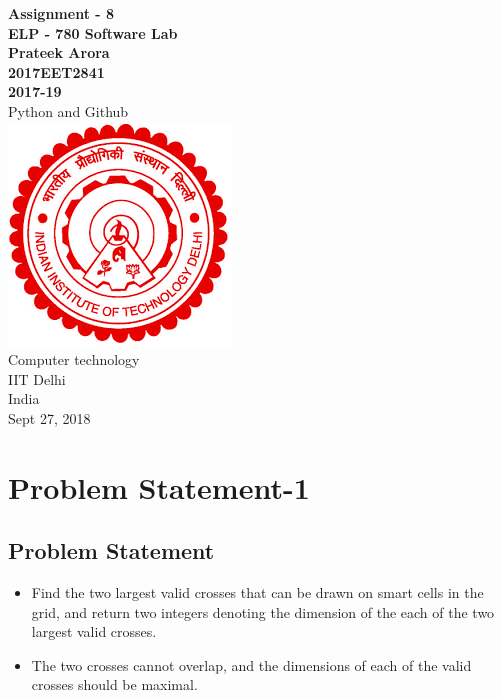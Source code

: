 \documentclass{article}
\begin{document}
\clearpage
\thispagestyle{empty}

\begin{center}
\Large\textbf{Assignment - 8}
\vspace*{1\baselineskip}
\\
\LARGE\textbf{ELP - 780 Software Lab}
\vspace*{1\baselineskip}
\\
\Large\textbf{Prateek Arora}
\\
\Large\textbf{2017EET2841}
\\
\Large\textbf{2017-19}
\\
\vspace*{1\baselineskip}
Python and Github
\\
\vspace*{5\baselineskip}
\includegraphics[scale = 0.8]{logo} %
\\
\vspace*{2\baselineskip}
Computer technology
\\IIT Delhi
\\India
\vspace*{1\baselineskip}
\\Sept 27, 2018
\end{center}

\tableofcontents
\setcounter{page}{1}
\newpage


\section{Problem Statement-1}
\subsection{Problem Statement}
\begin{itemize}
\item Find the two largest valid crosses that can be drawn on smart cells in the grid, and return two integers denoting the dimension of the each of the two largest valid crosses.
\item The two crosses cannot overlap, and the dimensions of each of the valid crosses should be maximal.
\end{itemize}
\end{document}
